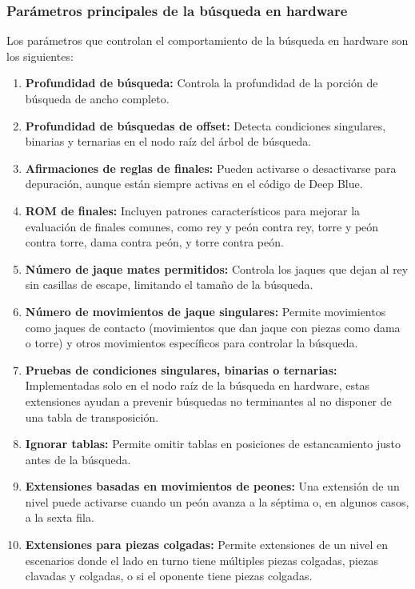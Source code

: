 \documentclass[12pt,a4paper]{article}
\begin{document}
\subsubsection*{Parámetros principales de la búsqueda en hardware}
Los parámetros que controlan el comportamiento de la búsqueda en hardware son los siguientes:
\begin{enumerate}
    \item \textbf{Profundidad de búsqueda:} Controla la profundidad de la porción de búsqueda de ancho completo.
    \item \textbf{Profundidad de búsquedas de offset:} Detecta condiciones singulares, binarias y ternarias en el nodo raíz del árbol de búsqueda.
    \item \textbf{Afirmaciones de reglas de finales:} Pueden activarse o desactivarse para depuración, aunque están siempre activas en el código de Deep Blue.
    \item \textbf{ROM de finales:} Incluyen patrones característicos para mejorar la evaluación de finales comunes, como rey y peón contra rey, torre y peón contra torre, dama contra peón, y torre contra peón.
    \item \textbf{Número de jaque mates permitidos:} Controla los jaques que dejan al rey sin casillas de escape, limitando el tamaño de la búsqueda.
    \item \textbf{Número de movimientos de jaque singulares:} Permite movimientos como jaques de contacto (movimientos que dan jaque con piezas como dama o torre) y otros movimientos específicos para controlar la búsqueda.
    \item \textbf{Pruebas de condiciones singulares, binarias o ternarias:} Implementadas solo en el nodo raíz de la búsqueda en hardware, estas extensiones ayudan a prevenir búsquedas no terminantes al no disponer de una tabla de transposición.
    \item \textbf{Ignorar tablas:} Permite omitir tablas en posiciones de estancamiento justo antes de la búsqueda.
    \item \textbf{Extensiones basadas en movimientos de peones:} Una extensión de un nivel puede activarse cuando un peón avanza a la séptima o, en algunos casos, a la sexta fila.
    \item \textbf{Extensiones para piezas colgadas:} Permite extensiones de un nivel en escenarios donde el lado en turno tiene múltiples piezas colgadas, piezas clavadas y colgadas, o si el oponente tiene piezas colgadas.
\end{enumerate}
\end{document}
